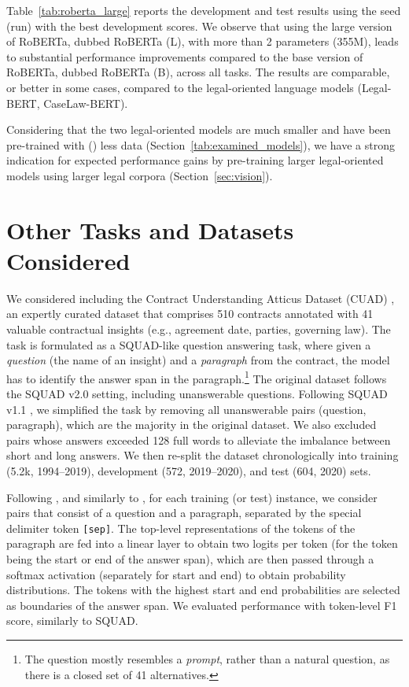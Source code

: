 \documentclass[11pt]{article}
\newcommand{\sep}{\texttt{\small [sep]}\xspace}
\begin{document}
Table~\ref{tab:roberta_large} reports the development and test results using the seed (run) with the best development scores. We observe that using the large version of RoBERTa, dubbed RoBERTa (L), with more than 2 parameters (355M),  leads to substantial performance improvements  compared  to  the  base  version  of RoBERTa, dubbed RoBERTa (B), across all tasks. 
The results are comparable, or better in some cases, compared to the legal-oriented language models (Legal-BERT, CaseLaw-BERT). 

Considering that the two legal-oriented models are much smaller and have been pre-trained with () less data (Section~\ref{tab:examined_models}), we have a strong indication for expected performance gains by pre-training larger legal-oriented models using larger legal corpora (Section~\ref{sec:vision}).




\section{Other Tasks and Datasets Considered}

We considered including the Contract Understanding Atticus Dataset (CUAD) \cite{Hendrycks2021CUAD}, an expertly curated dataset that comprises 510 contracts annotated with 41 valuable contractual insights (e.g., agreement date, parties, governing law). The task is formulated as a SQUAD-like question answering task, where given a \emph{question} (the name of an insight) and a \emph{paragraph} from the contract, the model has to identify the answer span in the paragraph.\footnote{The question mostly resembles a \emph{prompt}, rather than a natural question, as there is a closed set of 41 alternatives.} 
The original dataset follows the SQUAD v2.0 setting, including unanswerable questions.
Following SQUAD v1.1 \cite{rajpurkar-etal-2016-squad}, we simplified the task by removing all unanswerable pairs (question, paragraph), which are the majority in the original dataset. We also excluded pairs whose answers exceeded 128 full words to alleviate the imbalance between short and long answers. We then re-split the dataset chronologically into training (5.2k, 1994--2019), development (572, 2019--2020), and test (604, 2020) sets.

Following \citet{devlin-etal-2019-bert}, and similarly to \citet{Hendrycks2021CUAD}, for each training (or test) instance, we consider pairs that consist of a question and a paragraph, separated by the special delimiter token \sep. The top-level representations  of the tokens of the paragraph are fed into a linear layer to obtain two logits per token (for the token being the start or end of the answer span), which are then  passed through a softmax activation (separately for start and end) to obtain probability distributions. The tokens with the highest start and end probabilities are selected as boundaries of the answer span. We evaluated performance with token-level F1 score, similarly to SQUAD.
\end{document}

